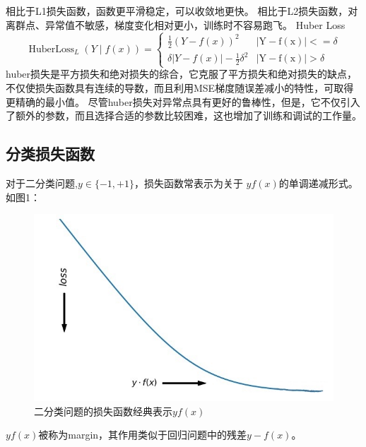\begin{outline}
		\3 相比于L1损失函数，函数更平滑稳定，可以收敛地更快。
		\3 相比于L2损失函数，对离群点、异常值不敏感，梯度变化相对更小，训练时不容易跑飞。
	\1 Huber Loss
	\begin{equation}\label{loss:5}
		\operatorname{Huber Loss}_{L}(Y \mid f(x))= \begin{cases}\frac{1}{2}(Y-f(x))^{2} & |\mathrm{Y}-\mathrm{f}(\mathrm{x})|<=\delta \\ \delta|Y-f(x)|-\frac{1}{2} \delta^{2} & |\mathrm{Y}-\mathrm{f}(\mathrm{x})|>\delta\end{cases}
		\end{equation}
	\2 huber损失是平方损失和绝对损失的综合，它克服了平方损失和绝对损失的缺点，不仅使损失函数具有连续的导数，而且利用MSE梯度随误差减小的特性，可取得更精确的最小值。
	\2 尽管huber损失对异常点具有更好的鲁棒性，但是，它不仅引入了额外的参数，而且选择合适的参数比较困难，这也增加了训练和调试的工作量。



		
\end{outline}

\subsection{分类损失函数}

\noindent 对于二分类问题,$y\in \{-1,+1\}$，损失函数常表示为关于 $ yf(x)$的单调递减形式。如图1：
\begin{figure}[h!] %
    \centering
    \includegraphics[scale=0.35]{figs/1.jpg} 
    \caption{二分类问题的损失函数经典表示$ yf(x)$}
    \label{fig:loss}
 \end{figure}

 \noindent $yf(x)$被称为margin，其作用类似于回归问题中的残差$y-f(x)$。

